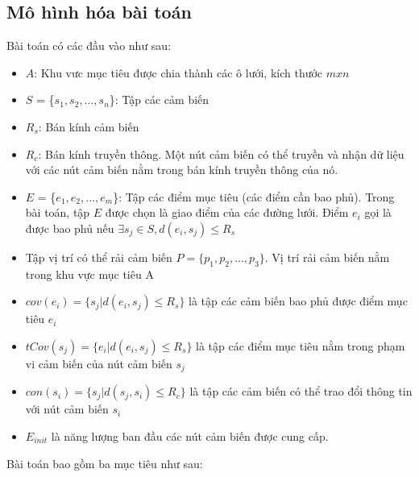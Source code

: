 \documentclass{article}
\begin{document}
\subsection{Mô hình hóa bài toán}
Bài toán có các đầu vào như sau:
\begin{itemize}
    \item $A$: Khu vưc mục tiêu được chia thành các ô lưới,  kích thước $mxn$
    \item $S$ = \{$s_1, s_2,..., s_n $\}: Tập các cảm biến
    \item $R_s$: Bán kính cảm biến 
    \item $R_c$: Bán kính truyền thông. Một nút cảm biến có thể truyền và nhận dữ liệu với các nút cảm biến nằm trong bán kính truyền thông của nó.
    \item $E$ = \{$e_1, e_2,..., e_m$\}: Tập các điểm mục tiêu (các điểm cần bao phủ). Trong bài toán, tập $E$ được chọn là giao điểm của các đường lưới. Điểm $e_i$ gọi là được bao phủ nếu $\exists s_j \in S, d(e_i, s_j) \leq R_s$
    \item Tập vị trí có thể rải cảm biến $P = \{p_1, p_2,..., p_3\}$. Vị trí rải cảm biến nằm trong khu vực mục tiêu A
    \item $ cov(e_i) = \{s_j | d(e_i, s_j) \leq R_s\}$ là tập các cảm biến bao phủ được điểm mục tiêu $e_i$
    \item $ tCov(s_j) = \{e_i | d(e_i, s_j) \leq R_s\}$ là tập các điểm mục tiêu nằm trong phạm vi cảm biến của nút cảm biến $s_j$
    \item $ con(s_i) = \{s_j | d(s_j, s_i) \leq R_c\}$ là tập các cảm biến có thể trao đổi thông tin với nút cảm biến $s_i$
    \item $E_{init}$ là năng lượng ban đầu các nút cảm biến được cung cấp.
\end{itemize}
Bài toán bao gồm ba mục tiêu như sau:
\end{document}
